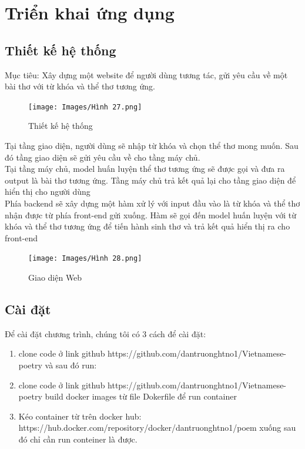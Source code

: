 \documentclass[a4paper]{article}
\theoremstyle{definition}
\begin{document}
\section{Triển khai ứng dụng}
\subsection{Thiết kế hệ thống }
Mục tiêu: Xây dựng một website để người dùng tương tác, gửi yêu cầu về một bài thơ với từ khóa và thể thơ tương ứng.\\
\begin{figure}[h!]
\begin{center}
\texttt{[image: Images/Hình 27.png]} \\[0.2in]

\caption{Thiết kế hệ thống}
\end{center}
\end{figure}
\newline
Tại tầng giao diện, người dùng sẽ nhập từ khóa và chọn thể thơ mong muốn. Sau đó tầng giao diện sẽ gửi yêu cầu về cho tầng máy chủ.\\
Tại tầng máy chủ, model huấn luyện thể thơ tương ứng sẽ được gọi và đưa ra output là bài thơ tương ứng. Tầng máy chủ trả kết quả lại cho tầng giao diện để hiển thị cho người dùng\\

Phía backend sẽ xây dựng một hàm xử lý với input đầu vào là từ khóa và thể thơ nhận được từ phía front-end gửi xuống. Hàm sẽ gọi đến model huấn luyện với từ khóa và thể thơ tương ứng để tiến hành sinh thơ và trả kết quả hiển thị ra cho front-end
\begin{figure}[h!]
\begin{center}
\texttt{[image: Images/Hình 28.png]} \\[0.2in]

\caption{Giao diện Web}
\end{center}
\end{figure}
\subsection{Cài đặt}
Để cài đặt chương trình, chúng tôi có 3 cách để cài đặt: 
\begin{enumerate}[Cách 1.]
\item clone code ở link github  https://github.com/dantruonghtno1/Vietnamese-poetry và sau đó run: 
\item clone code ở link github https://github.com/dantruonghtno1/Vietnamese-poetry build docker images từ file Dokerfile để run container 
\item Kéo container từ trên docker hub: https://hub.docker.com/repository/docker/dantruonghtno1/poem  xuống sau đó chỉ cần run conteiner là được.

\end{enumerate}
\end{document}
